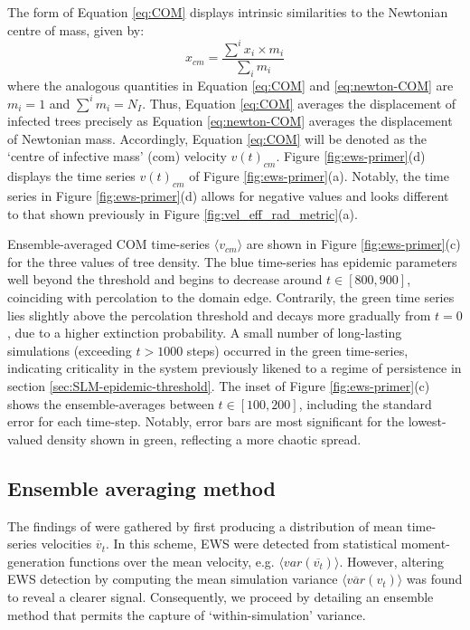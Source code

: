 The form of Equation \ref{eq:COM} displays intrinsic similarities to the Newtonian centre of mass, given by:
\begin{equation}
 x_{cm} = \frac{\sum^i x_i\times m_i}{\sum_i m_i}
\label{eq:newton-COM}
\end{equation}
where the analogous quantities in Equation \ref{eq:COM} and \ref{eq:newton-COM} are $m_i=1$ and $\sum^im_i= N_I$.
Thus, Equation \ref{eq:COM} averages the displacement of infected trees precisely as Equation \ref{eq:newton-COM} averages the displacement of Newtonian mass. Accordingly, Equation \ref{eq:COM} will be denoted as the `centre of infective mass' (\acrshort{com}) velocity $v(t)_{cm}$. 
Figure \ref{fig:ews-primer}(d) displays the time series $v(t)_{cm}$ of Figure \ref{fig:ews-primer}(a). Notably, the time series in Figure \ref{fig:ews-primer}(d) allows for negative values and looks different to that shown previously in Figure \ref{fig:vel_eff_rad_metric}(a).

Ensemble-averaged COM time-series $\langle v_{cm}\rangle$ are shown in Figure \ref{fig:ews-primer}(c) for the three values of tree density.
The blue time-series has epidemic parameters well beyond the threshold and begins to decrease around $t \in [800, 900]$, coinciding with percolation to the domain edge.
Contrarily, the green time series lies slightly above the percolation threshold and decays more gradually from $t=0$, due to a higher extinction probability. 
A small number of long-lasting simulations (exceeding $t>1000$ steps) occurred in the green time-series, indicating criticality in the system\textemdash 
previously likened to a regime of persistence in section \ref{sec:SLM-epidemic-threshold}.
The inset of Figure \ref{fig:ews-primer}(c) shows the ensemble-averages between $t\in [100, 200]$, including the standard error for each time-step.
Notably, error bars are most significant for the lowest-valued density shown in green, reflecting a more chaotic spread.

\subsection{Ensemble averaging method}
\label{sec:ens-avg-method}

The findings of \cite{OROZCOFUENTES201912} were gathered by first producing a distribution of mean time-series velocities $\overline{v}_t$.
In this scheme, EWS were detected from statistical moment-generation functions over the mean velocity, e.g. $\big\langle var(\overline{v_t}) \big\rangle $.
However, altering EWS detection by computing the mean simulation variance $ \big\langle \overline{var}({v}_t) \big\rangle $ was found to reveal a clearer signal.
Consequently, we proceed by detailing an ensemble method that permits the capture of `within-simulation' variance. 

